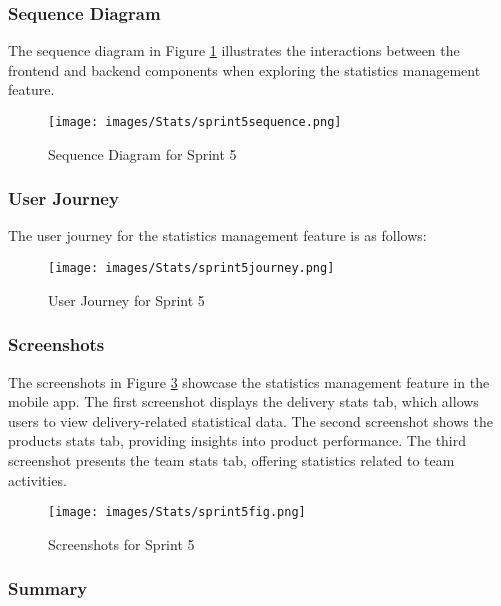 \subsubsection{Sequence Diagram}

The sequence diagram in Figure \ref{fig:sequence_sprint5} illustrates the interactions between the frontend and backend components when exploring the statistics management feature.

\begin{figure}[H]
    \centering
    \texttt{[image: images/Stats/sprint5sequence.png]}
    \caption{Sequence Diagram for Sprint 5}
    \label{fig:sequence_sprint5}
\end{figure}

\subsubsection{User Journey}

The user journey for the statistics management feature is as follows:

\begin{figure}[H]
    \centering
    \texttt{[image: images/Stats/sprint5journey.png]}
    \caption{User Journey for Sprint 5}
    \label{fig:activity_sprint5}
\end{figure}

\subsubsection{Screenshots}

The screenshots in Figure \ref{fig:screenshots_sprint5} showcase the statistics management feature in the mobile app. The first screenshot displays the delivery stats tab, which allows users to view delivery-related statistical data. The second screenshot shows the products stats tab, providing insights into product performance. The third screenshot presents the team stats tab, offering statistics related to team activities.

\begin{figure}[H]
    \centering
    \texttt{[image: images/Stats/sprint5fig.png]}
    \caption{Screenshots for Sprint 5}
    \label{fig:screenshots_sprint5}
\end{figure}

\subsubsection{Summary}


